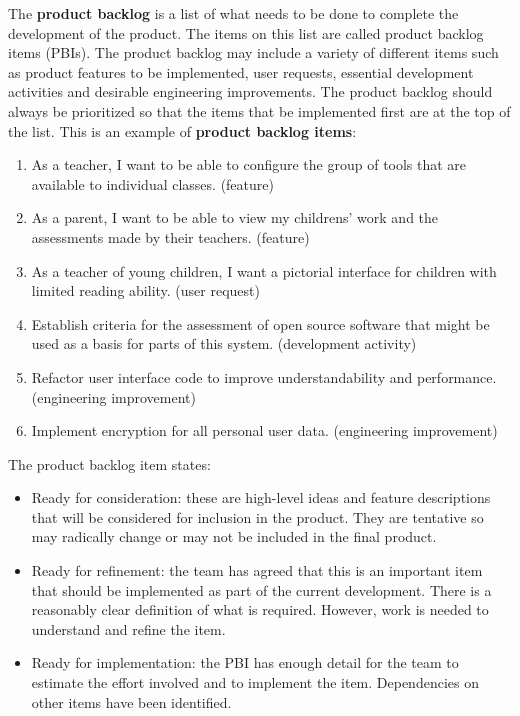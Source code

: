 \documentclass[10pt,a4paper]{report}
\begin{document}
The \textbf{product backlog} is a list of what needs to be done to complete the
development of the product. The items on this list are called product backlog items (PBIs).
The product backlog may include a variety of different items such as product features to be implemented, user requests, essential development activities and desirable engineering improvements.
The product backlog should always be prioritized so that the items that be implemented first are at the top of the list. This is an example of \textbf{product backlog items}:
\begin{enumerate}
	
	\item As a teacher, I want to be able to configure the group of tools that
	are available to individual classes. (feature)
	
	\item As a parent, I want to be able to view my childrens’ work and the
	assessments made by their teachers. (feature)
	
	\item As a teacher of young children, I want a pictorial interface for
	children with limited reading ability. (user request)
	
	\item  Establish criteria for the assessment of open source software that
	might be used as a basis for parts of this system. (development activity)
	
	\item  Refactor user interface code to improve understandability and
	performance. (engineering improvement)
	
	\item  Implement encryption for all personal user data. (engineering
	improvement)
\end{enumerate}

The product backlog item states:
\begin{itemize}
	\item Ready for consideration: these are high-level ideas and feature descriptions that will be
	considered for inclusion in the product. They are tentative so may
	radically change or may not be included in the final product.
	
	\item Ready for refinement: the team has agreed that this is an important item that should be
	implemented as part of the current development. There is a
	reasonably clear definition of what is required. However, work is
	needed to understand and refine the item.
	
	\item Ready for implementation: the PBI has enough detail for the team to estimate the effort involved
	and to implement the item. Dependencies on other items have been
	identified.
\end{itemize}
\end{document}
